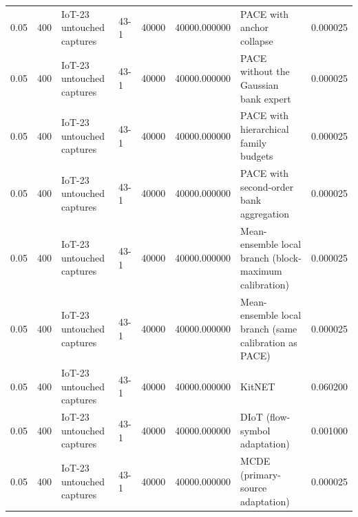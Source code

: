 \begin{tabular}{llllllll}
0.05 & 400 & IoT-23 untouched captures & 43-1 & 40000 & 40000.000000 & PACE with anchor collapse & 0.000025 \\
0.05 & 400 & IoT-23 untouched captures & 43-1 & 40000 & 40000.000000 & PACE without the Gaussian bank expert & 0.000025 \\
0.05 & 400 & IoT-23 untouched captures & 43-1 & 40000 & 40000.000000 & PACE with hierarchical family budgets & 0.000025 \\
0.05 & 400 & IoT-23 untouched captures & 43-1 & 40000 & 40000.000000 & PACE with second-order bank aggregation & 0.000025 \\
0.05 & 400 & IoT-23 untouched captures & 43-1 & 40000 & 40000.000000 & Mean-ensemble local branch (block-maximum calibration) & 0.000025 \\
0.05 & 400 & IoT-23 untouched captures & 43-1 & 40000 & 40000.000000 & Mean-ensemble local branch (same calibration as PACE) & 0.000025 \\
0.05 & 400 & IoT-23 untouched captures & 43-1 & 40000 & 40000.000000 & KitNET & 0.060200 \\
0.05 & 400 & IoT-23 untouched captures & 43-1 & 40000 & 40000.000000 & DIoT (flow-symbol adaptation) & 0.001000 \\
0.05 & 400 & IoT-23 untouched captures & 43-1 & 40000 & 40000.000000 & MCDE (primary-source adaptation) & 0.000025 \\
\bottomrule
\end{tabular}
